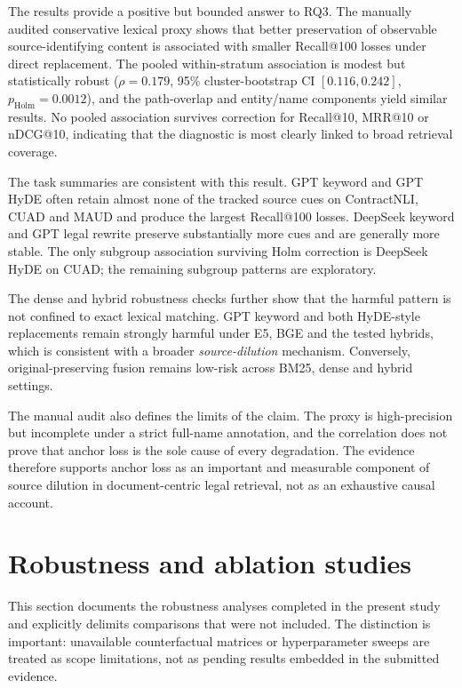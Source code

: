 \documentclass[a4paper,fleqn]{cas-dc}
\begin{document}
The results provide a positive but bounded answer to RQ3. The manually
audited conservative lexical proxy shows that better preservation of
observable source-identifying content is associated with smaller
Recall@100 losses under direct replacement. The pooled within-stratum
association is modest but statistically robust
($\rho=0.179$, 95\% cluster-bootstrap CI $[0.116,0.242]$,
$p_{\mathrm{Holm}}=0.0012$), and the path-overlap and entity/name
components yield similar results. No pooled association survives
correction for Recall@10, MRR@10 or nDCG@10, indicating that the
diagnostic is most clearly linked to broad retrieval coverage.

The task summaries are consistent with this result. GPT keyword and GPT
HyDE often retain almost none of the tracked source cues on
ContractNLI, CUAD and MAUD and produce the largest Recall@100 losses.
DeepSeek keyword and GPT legal rewrite preserve substantially more cues
and are generally more stable. The only subgroup association surviving
Holm correction is DeepSeek HyDE on CUAD; the remaining subgroup
patterns are exploratory.

The dense and hybrid robustness checks further show that the harmful
pattern is not confined to exact lexical matching. GPT keyword and both
HyDE-style replacements remain strongly harmful under E5, BGE and the
tested hybrids, which is consistent with a broader
\textit{source-dilution} mechanism. Conversely, original-preserving
fusion remains low-risk across BM25, dense and hybrid settings.

The manual audit also defines the limits of the claim. The proxy is
high-precision but incomplete under a strict full-name annotation, and
the correlation does not prove that anchor loss is the sole cause of
every degradation. The evidence therefore supports anchor loss as an
important and measurable component of source dilution in
document-centric legal retrieval, not as an exhaustive causal account.

\section{Robustness and ablation studies}
\label{sec:robustness}
This section documents the robustness analyses completed in the
present study and explicitly delimits comparisons that were not included.
The distinction is important: unavailable counterfactual matrices or
hyperparameter sweeps are treated as scope limitations, not as pending
results embedded in the submitted evidence.
\end{document}
